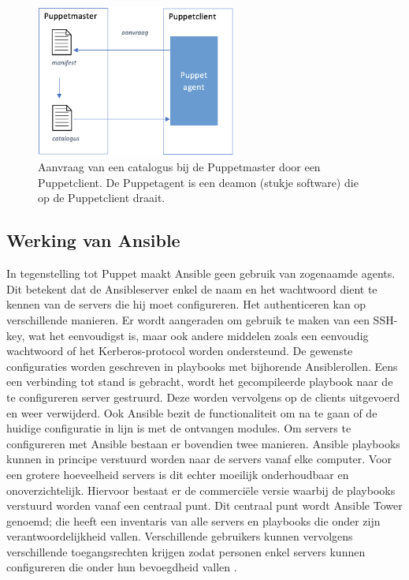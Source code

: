 \begin{figure}  \begin{center}
  \includegraphics[width=250px]{img/aanvraagCatalogus.png}
 \end{center}\caption{Aanvraag van een catalogus bij de Puppetmaster door een Puppetclient. De Puppetagent is een deamon (stukje software) die op de Puppetclient draait.}  
  \label{fig:aanvraagCatalogus}
\end{figure}


\subsection{Werking van Ansible}

In tegenstelling tot Puppet maakt Ansible geen gebruik van zogenaamde agents. Dit betekent dat de Ansibleserver enkel de naam en het wachtwoord dient te kennen van de servers die hij moet configureren. Het authenticeren kan op verschillende manieren. Er wordt aangeraden om gebruik te maken van een SSH-key, wat het eenvoudigst is, maar ook andere middelen zoals een eenvoudig wachtwoord of het Kerberos-protocol worden ondersteund. De gewenste configuraties worden geschreven in playbooks met bijhorende Ansiblerollen. Eens een verbinding tot stand is gebracht, wordt het gecompileerde playbook naar de te configureren server gestruurd. Deze worden vervolgens op de clients uitgevoerd  en weer verwijderd. Ook Ansible bezit de functionaliteit om na te gaan of de huidige configuratie in lijn is met de ontvangen modules. Om servers te configureren met Ansible bestaan er bovendien twee manieren. Ansible playbooks kunnen in principe verstuurd worden naar de servers vanaf elke computer. Voor een grotere hoeveelheid servers is dit echter moeilijk onderhoudbaar en onoverzichtelijk. Hiervoor bestaat er de commerci\"ele versie waarbij de playbooks verstuurd worden vanaf een centraal punt. Dit centraal punt wordt Ansible Tower genoemd; die heeft een inventaris van alle servers en playbooks die onder zijn verantwoordelijkheid vallen. Verschillende gebruikers kunnen vervolgens verschillende toegangsrechten krijgen zodat personen enkel servers kunnen configureren die onder hun bevoegdheid vallen \autocite{ansibledoc}.

